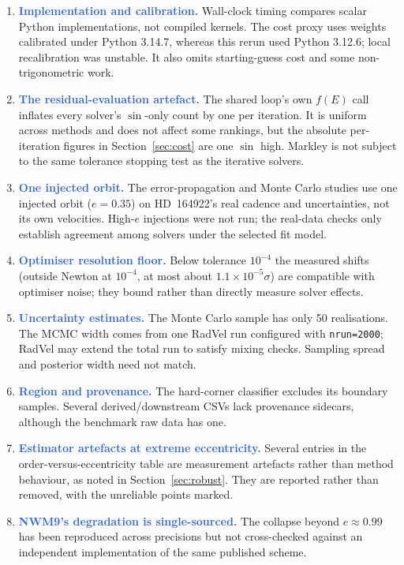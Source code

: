 \documentclass[11pt,a4paper]{article}
\newcommand{\key}[1]{\textcolor{Highlight}{\bfseries #1}}
\begin{document}
\begin{enumerate}
  \item \key{Implementation and calibration.} Wall-clock timing compares
        scalar Python implementations, not compiled kernels. The cost
        proxy uses weights calibrated under Python 3.14.7, whereas this
        rerun used Python 3.12.6; local recalibration was unstable. It
        also omits starting-guess cost and some non-trigonometric work.
  \item \key{The residual-evaluation artefact.} The shared loop's own
        $f(E)$ call inflates every solver's $\sin$-only count by one per
        iteration. It is uniform across methods and does not affect
        some rankings, but the absolute per-iteration figures in
        Section~\ref{sec:cost} are one $\sin$ high. Markley is not subject
        to the same tolerance stopping test as the iterative solvers.
  \item \key{One injected orbit.} The error-propagation and Monte Carlo
        studies use one injected orbit ($e=0.35$) on HD~164922's real
        cadence and uncertainties, not its own velocities. High-$e$
        injections were not run; the real-data checks only establish
        agreement among solvers under the selected fit model.
  \item \key{Optimiser resolution floor.} Below tolerance $10^{-4}$ the
        measured shifts (outside Newton at $10^{-4}$, at most about
        $1.1\times10^{-5}\sigma$) are compatible with optimiser noise;
        they bound rather than directly measure solver effects.
  \item \key{Uncertainty estimates.} The Monte Carlo sample has only 50
        realisations. The MCMC width comes from one RadVel run configured
        with \texttt{nrun=2000}; RadVel may extend the total run to satisfy
        mixing checks. Sampling spread and posterior width need not match.
  \item \key{Region and provenance.} The hard-corner classifier excludes
        its boundary samples. Several derived/downstream CSVs lack
        provenance sidecars, although the benchmark raw data has one.
  \item \key{Estimator artefacts at extreme eccentricity.} Several entries
        in the order-versus-eccentricity table are measurement artefacts
        rather than method behaviour, as noted in
        Section~\ref{sec:robust}. They are reported rather than removed,
        with the unreliable points marked.
  \item \key{NWM9's degradation is single-sourced.} The collapse beyond
        $e \approx 0.99$ has been reproduced across precisions but not
        cross-checked against an independent implementation of the same
        published scheme.
\end{enumerate}
\end{document}
